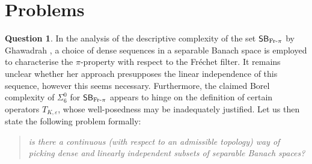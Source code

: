 \documentclass[12pt,fleqn]{amsart}
\theoremstyle{definition}
\newtheorem{question}[theorem]{Question}
\theoremstyle{remark}
\begin{document}
\section{Problems}
\begin{question}
In the analysis of the descriptive complexity of the set $\mathsf{SB}_{{\rm Fr}\text{-}\pi}$ by Gha\-wa\-drah \cite{GhaFund}, a choice of dense sequences in a separable Banach space is employed to characterise the $\pi$-property with respect to the Fréchet filter. It remains unclear whether her approach presupposes the linear independence of this sequence, however this seems necessary. Furthermore, the claimed Borel complexity of $\Sigma^0_6$ for $\mathsf{SB}_{{\rm Fr}\text{-}\pi}$ appears to hinge on the definition of certain operators $T_{K,\varepsilon}$, whose well-posedness may be inadequately justified. Let us then state the following problem formally: 
\begin{quote}\emph{is there a continuous (with respect to an admissible topology) way of picking dense and linearly independent subsets of separable Banach spaces?}
\end{quote}
\end{question}

%
\end{document}
